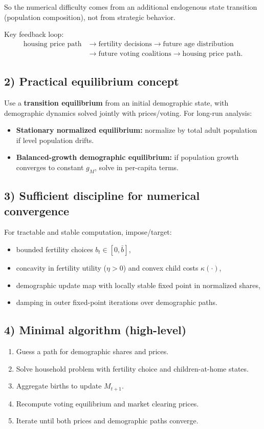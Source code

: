 \documentclass[11pt]{article}
\begin{document}
So the numerical difficulty comes from an additional endogenous state transition (population composition), not from strategic behavior.

Key feedback loop:
\begin{align}
\text{housing price path}
&\rightarrow \text{fertility decisions}
\rightarrow \text{future age distribution} \nonumber\\
&\rightarrow \text{future voting coalitions}
\rightarrow \text{housing price path}.
\end{align}

\subsection*{2) Practical equilibrium concept}
Use a \textbf{transition equilibrium} from an initial demographic state, with demographic dynamics solved jointly with prices/voting. For long-run analysis:
\begin{itemize}
\item \textbf{Stationary normalized equilibrium:} normalize by total adult population if level population drifts.
\item \textbf{Balanced-growth demographic equilibrium:} if population growth converges to constant $g_M$, solve in per-capita terms.
\end{itemize}

\subsection*{3) Sufficient discipline for numerical convergence}
For tractable and stable computation, impose/target:
\begin{itemize}
\item bounded fertility choices $b_t\in[0,\bar b]$,
\item concavity in fertility utility ($\eta>0$) and convex child costs $\kappa(\cdot)$,
\item demographic update map with locally stable fixed point in normalized shares,
\item damping in outer fixed-point iterations over demographic paths.
\end{itemize}

\subsection*{4) Minimal algorithm (high-level)}
\begin{enumerate}
\item Guess a path for demographic shares and prices.
\item Solve household problem with fertility choice and children-at-home states.
\item Aggregate births to update $M_{t+1}$.
\item Recompute voting equilibrium and market clearing prices.
\item Iterate until both prices and demographic paths converge.
\end{enumerate}
\end{document}

